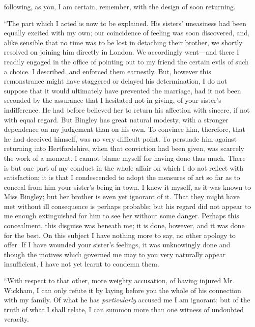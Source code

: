 following, as you, I am certain, remember, with the design of soon returning.

“The part which I acted is now to be explained. His sisters' uneasiness had been equally excited with my own; our coincidence of feeling was soon discovered, and, alike sensible that no time was to be lost in detaching their brother, we shortly resolved on joining him directly in London. We accordingly went---and there I readily engaged in the office of pointing out to my friend the certain evils of such a choice. I described, and enforced them earnestly. But, however this remonstrance might have staggered or delayed his determination, I do not suppose that it would ultimately have prevented the marriage, had it not been seconded by the assurance that I hesitated not in giving, of your sister's indifference. He had before believed her to return his affection with sincere, if not with equal regard. But Bingley has great natural modesty, with a stronger dependence on my judgement than on his own. To convince him, therefore, that he had deceived himself, was no very difficult point. To persuade him against returning into Hertfordshire, when that conviction had been given, was scarcely the work of a moment. I cannot blame myself for having done thus much. There is but one part of my conduct in the whole affair on which I do not reflect with satisfaction; it is that I condescended to adopt the measures of art so far as to conceal from him your sister's being in town. I knew it myself, as it was known to Miss Bingley; but her brother is even yet ignorant of it. That they might have met without ill consequence is perhaps probable; but his regard did not appear to me enough extinguished for him to see her without some danger. Perhaps this concealment, this disguise was beneath me; it is done, however, and it was done for the best. On this subject I have nothing more to say, no other apology to offer. If I have wounded your sister's feelings, it was unknowingly done and though the motives which governed me may to you very naturally appear insufficient, I have not yet learnt to condemn them.

“With respect to that other, more weighty accusation, of having injured Mr. Wickham, I can only refute it by laying before you the whole of his connection with my family. Of what he has {\em particularly} accused me I am ignorant; but of the truth of what I shall relate, I can summon more than one witness of undoubted veracity.

